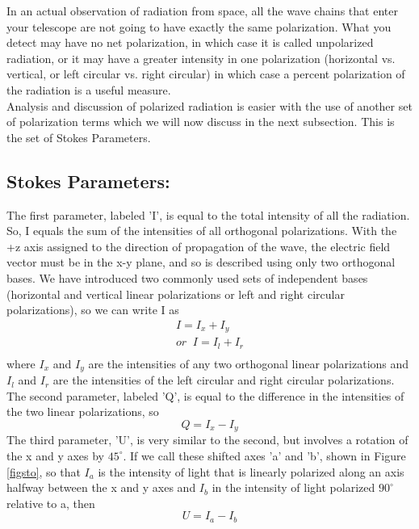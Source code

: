 \documentclass[10pt]{report}
\begin{document}
In an actual observation of radiation from space, all the wave chains that enter your telescope are not going to have exactly the same polarization.  What you detect may have no net polarization, in which case it is called unpolarized radiation, or it may have a greater intensity in one polarization (horizontal vs. vertical, or left circular vs. right circular) in which case a percent polarization of the radiation is a useful measure.  \\
Analysis and discussion of polarized radiation is easier with the use of another set of polarization terms which we will now discuss in the next subsection.  This is the set of Stokes Parameters. \\
\subsection{Stokes Parameters:}
The first parameter, labeled 'I', is equal to the total intensity of all the radiation.  So, I equals the sum of the intensities of all orthogonal polarizations.  With the +z axis assigned to the direction of propagation of the wave, the electric field vector must be in the x-y plane, and so is described using only two orthogonal bases.  We have introduced two commonly used sets of independent bases (horizontal and vertical linear polarizations or left and right circular polarizations), so we can write I as
\begin{eqnarray}
I=I_x+I_y\\
or \;\; I=I_l+I_r\\
\end{eqnarray}
where $I_x$ and $I_y$ are the intensities of any two orthogonal linear polarizations and $I_l$ and $I_r$ are the intensities of the left circular and right circular polarizations. \\
The second parameter, labeled 'Q', is equal to the difference in the intensities of the two linear polarizations, so 
\begin{equation}
Q=I_x-I_y
\end{equation}
 The third parameter, 'U', is very similar to the second, but involves a rotation of the x and y axes by $45^\circ$.  If we call these shifted axes 'a' and 'b', shown in Figure \ref{figsto}, so that $I_a$ is the intensity of light that is linearly polarized along an axis halfway between the x and y axes and $I_b$ in the intensity of light polarized $90^\circ$ relative to a, then
 \begin{equation}
 U=I_a-I_b
 \end{equation}
\end{document}
